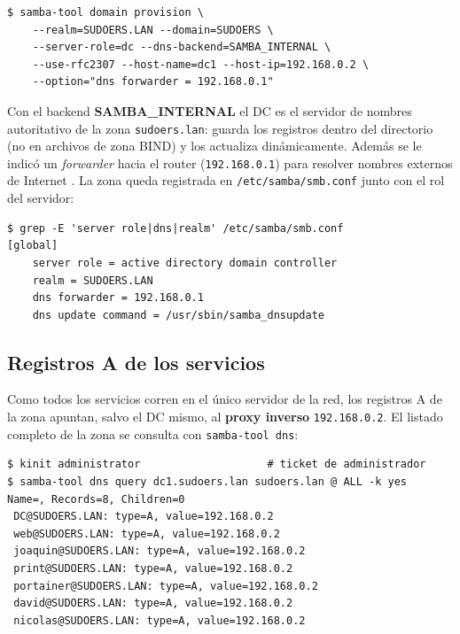 \begin{lstlisting}[style=terminal]
$ samba-tool domain provision \
    --realm=SUDOERS.LAN --domain=SUDOERS \
    --server-role=dc --dns-backend=SAMBA_INTERNAL \
    --use-rfc2307 --host-name=dc1 --host-ip=192.168.0.2 \
    --option="dns forwarder = 192.168.0.1"
\end{lstlisting}

Con el backend \textbf{SAMBA\_INTERNAL} el DC es el servidor de nombres
autoritativo de la zona \texttt{sudoers.lan}: guarda los registros dentro del
directorio (no en archivos de zona BIND) y los actualiza din\'amicamente.
Adem\'as se le indic\'o un \textit{forwarder} hacia el router
(\texttt{192.168.0.1}) para resolver nombres externos de Internet
\citep{iscBIND9}. La zona queda registrada en \texttt{/etc/samba/smb.conf}
junto con el rol del servidor:

\begin{lstlisting}[style=terminal]
$ grep -E 'server role|dns|realm' /etc/samba/smb.conf
[global]
    server role = active directory domain controller
    realm = SUDOERS.LAN
    dns forwarder = 192.168.0.1
    dns update command = /usr/sbin/samba_dnsupdate
\end{lstlisting}


\subsection{Registros A de los servicios}

Como todos los servicios corren en el \'unico servidor de la red, los
registros A de la zona apuntan, salvo el DC mismo, al \textbf{proxy inverso}
\texttt{192.168.0.2}. El listado completo de la zona se consulta con
\texttt{samba-tool dns}:

\begin{lstlisting}[style=terminal]
$ kinit administrator                    # ticket de administrador
$ samba-tool dns query dc1.sudoers.lan sudoers.lan @ ALL -k yes
Name=, Records=8, Children=0
 DC@SUDOERS.LAN: type=A, value=192.168.0.2
 web@SUDOERS.LAN: type=A, value=192.168.0.2
 joaquin@SUDOERS.LAN: type=A, value=192.168.0.2
 print@SUDOERS.LAN: type=A, value=192.168.0.2
 portainer@SUDOERS.LAN: type=A, value=192.168.0.2
 david@SUDOERS.LAN: type=A, value=192.168.0.2
 nicolas@SUDOERS.LAN: type=A, value=192.168.0.2
\end{lstlisting}

